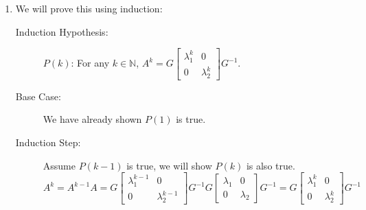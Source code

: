 \begin{enumerate}
    \item We will prove this using induction:
    \begin{description}
    \item[Induction Hypothesis:] \(P(k)\): For any \(k \in \mathbb{N}\), \(A^k = G
    \begin{bmatrix}
    \lambda_{1}^{k} & 0 \\
    0 & \lambda_{2}^{k} \end{bmatrix} G^{-1}\). 
    \item[Base Case:]
      We have already shown \(P(1)\) is true.
    \item[Induction Step:] Assume \(P(k-1)\) is true, we will show \(P(k)\) is also true. 
      \[A^k = A^{k-1}A = G 
    \begin{bmatrix}
    \lambda_{1}^{k-1} & 0 \\
    0 & \lambda_{2}^{k-1}
    \end{bmatrix} G^{-1} G 
    \begin{bmatrix}
    \lambda_{1} & 0 \\
    0 & \lambda_{2} \end{bmatrix} G^{-1}= G 
    \begin{bmatrix}
    \lambda_{1}^{k} & 0 \\
    0 & \lambda_{2}^{k} \end{bmatrix} G^{-1}  \]
  \end{description}
    
    
     

\end{enumerate}
